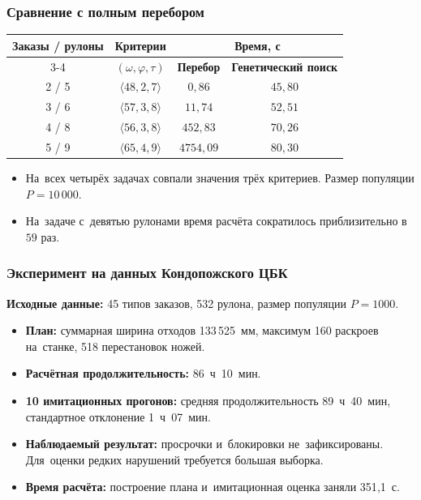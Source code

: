 \begin{frame}
    \frametitle{Сравнение с полным перебором}
    \centering
    
    \begin{tabular}{|c|c|c|c|}
        \hline
        \textbf{Заказы / рулоны} & \textbf{Критерии} & \multicolumn{2}{c|}{\textbf{Время, с}} \\
        \cline{3-4}
        & $(\omega,\varphi,\tau)$ & \textbf{Перебор} & \textbf{Генетический поиск} \\
        \hline
        2 / 5 & $\langle48,2,7\rangle$ & $0{,}86$ & $45{,}80$ \\
        3 / 6 & $\langle57,3,8\rangle$ & $11{,}74$ & $52{,}51$ \\
        4 / 8 & $\langle56,3,8\rangle$ & $452{,}83$ & $70{,}26$ \\
        5 / 9 & $\langle65,4,9\rangle$ & $4754{,}09$ & $80{,}30$ \\
        \hline
    \end{tabular}
    \vspace{0.3cm}
    \begin{itemize}
        \item На~всех четырёх задачах совпали значения трёх критериев. Размер популяции $P=10\,000$.
        \item На~задаче с~девятью рулонами время расчёта сократилось приблизительно в~$59$ раз.
    \end{itemize}
\end{frame}

\begin{frame}
    \frametitle{Эксперимент на данных Кондопожского ЦБК}
    \textbf{Исходные данные:} 45 типов заказов, 532 рулона, размер популяции $P=1000$.
    \vspace{0.2cm}
    \begin{itemize}
        \item \textbf{План:} суммарная ширина отходов 133\,525~мм, максимум 160 раскроев на~станке, 518 перестановок ножей.
        \item \textbf{Расчётная продолжительность:} 86~ч~10~мин.
        \item \textbf{10 имитационных прогонов:} средняя продолжительность 89~ч~40~мин, стандартное отклонение 1~ч~07~мин.
        \item \textbf{Наблюдаемый результат:} просрочки и~блокировки не~зафиксированы. Для~оценки редких нарушений требуется большая выборка.
        \item \textbf{Время расчёта:} построение плана и~имитационная оценка заняли 351{,}1~с.
    \end{itemize}
\end{frame}